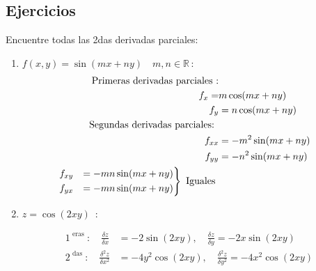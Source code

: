 \subsection{Ejercicios}
Encuentre todas las 2das derivadas parciales:
\begin{enumerate}
    \item $f(x,y)=\sin (mx+ny)\quad m,n \in \mathbb{R}\,$:  
        \begin{align*}
                \text{  Primeras derivadas parciales  :} \\ 
                f_x =& m \cos (mx+ny) \\ 
                f_y &= n \cos (mx+ny ) \\ 
                \text{  Segundas derivadas parciales:   } \\ 
                f_{xx} &= -m^2 \sin (mx+ny ) \\ 
                f_{yy} &= -n ^2 \sin (mx+ny) \\ 
                \begin{rcases}
                    f_{xy} &= -mn \sin (mx+ny) \\ 
                    f_{yx} &= -mn \sin (mx+ny) \\ 
                \end{rcases} \text{  Iguales  } \\ 
        \end{align*}
    
    \item $z = \cos (2xy)\,$ : 
        \begin{center}
           \begin{align*}
               1^{\text{  eras  }}: \quad \frac{\delta z }{\delta x} &= -2 \sin (2xy) 
               ,\quad \frac{\delta z}{\delta y } = -2x \sin (2xy) 
               \\  
               2^{\text{  das  }}: \quad \frac{\delta ^2 z}{\delta x^2} &= -4 y^2 \cos (2xy) ,\quad \frac{\delta^2 z }{\delta y^2} = -4x^2 \cos (2xy) \\  
           \end{align*}
        \end{center}
\end{enumerate}



























% 
